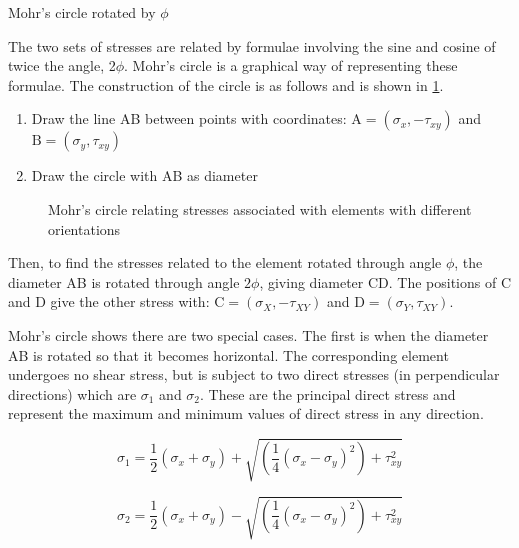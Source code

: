 \begin{marginfigure}
    \centering
    
    \caption{Mohr's circle rotated by \(\phi\)}
    \label{fig-rotated-mohrs-circle}
\end{marginfigure}

The two sets of stresses are related by formulae involving the sine and cosine of twice the angle, 2\(\phi\). Mohr's circle is a graphical way of representing these formulae. The construction of the circle is as follows and is shown in \cref{fig-m-circle}.

\begin{enumerate}
    \item Draw the line AB between points with coordinates: \(\text{A} = (\sigma_x, -\tau_{xy}) \) and \(\text{B} = (\sigma_y, \tau_{xy}) \)
    \item Draw the circle with AB as diameter
\end{enumerate}

\begin{figure}[h!]
    
    \caption{Mohr's circle relating stresses associated with elements with different orientations}
    \label{fig-m-circle}
\end{figure}

Then, to find the stresses related to the element rotated through angle \(\phi\), the diameter AB is rotated through angle \(2\phi\), giving diameter CD. The positions of C and D give the other stress with: \(\text{C} = (\sigma_X, -\tau_{XY}) \) and \(\text{D} = (\sigma_Y, \tau_{XY}) \).

Mohr's circle shows there are two special cases. The first is when the diameter AB is rotated so that it becomes horizontal. The corresponding element undergoes no shear stress, but is subject to two direct stresses (in perpendicular directions) which are \(\sigma_1\) and \(\sigma_2\). These are the principal direct stress and represent the maximum and minimum values of direct stress in any direction.

\begin{equation}
    \sigma_1 = \frac{1}{2}(\sigma_x+\sigma_y) + \sqrt{\left(\frac{1}{4}(\sigma_x-\sigma_y)^2\right)+\tau_{xy}^2}
\end{equation}

\begin{equation}
    \sigma_2 = \frac{1}{2}(\sigma_x+\sigma_y) - \sqrt{\left(\frac{1}{4}(\sigma_x-\sigma_y)^2\right)+\tau_{xy}^2}
\end{equation}

